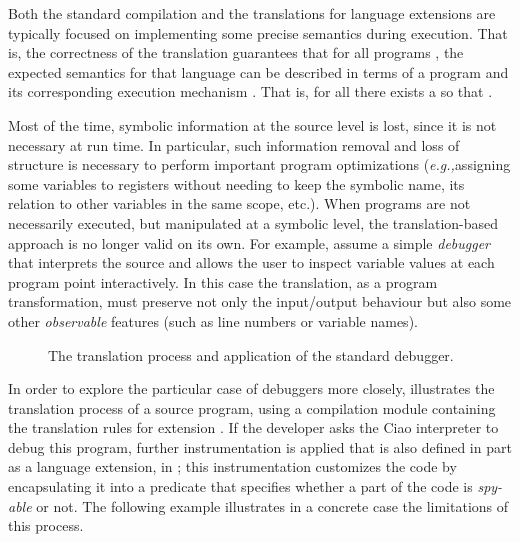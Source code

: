 \documentclass[preprint]{llncs}
\renewcommand\cref[1]{\Cref{#1}}
\newcommand{\eg}{\emph{e.g.,\xspace}}
\begin{document}
Both the standard compilation and the translations for language
extensions are 
typically focused on implementing some precise semantics during
execution. That is, the correctness of the translation guarantees
that for all programs , the expected semantics
 for that language can be described in terms of a
program  and its corresponding execution mechanism
. That is, for all  there
exists a  so that .

Most of the time, symbolic information at the source level is lost,
since it is not necessary at run time. In particular, such information
removal and loss of structure is necessary to perform
important program optimizations (\eg assigning some variables to
registers without needing to keep the symbolic name, its relation
to other variables in the same scope, etc.). When programs are not
necessarily executed, but manipulated at a symbolic level, the
translation-based approach is no longer valid on its own. For example,
assume a simple \emph{debugger} that interprets the source and allows
the user to inspect variable values at each program point
interactively. In this case the translation, as a program
transformation, must preserve not only the input/output
behaviour but also some other \emph{observable} features (such as line
numbers or variable names).

\begin{figure}[t]
     \centering
\caption{The translation process and application of the standard debugger.}
\label{fig:debugprocess}
\end{figure}

In order to explore the particular case of debuggers more closely,
\cref{fig:debugprocess} illustrates the translation process of a
source program, using a compilation module 
containing the translation rules for extension . If the developer
asks the Ciao interpreter to debug this program, further
instrumentation is applied that is also defined in part as a language
extension,  in \cref{fig:debugprocess}; this
instrumentation customizes the code by encapsulating it into a
predicate that specifies whether a part of the code is \emph{spy-able}
or not. The following example illustrates in a concrete case 
the limitations of this process.  
\end{document}
